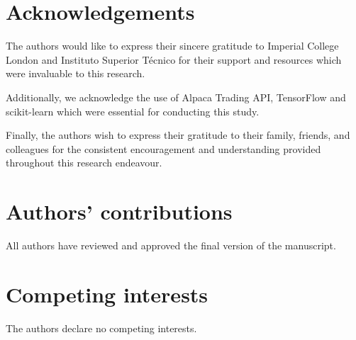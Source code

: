 \documentclass[letterpaper]{article}
\begin{document}
\section*{Acknowledgements}
The authors would like to express their sincere gratitude to Imperial College London and Instituto Superior Técnico for their support and resources which were invaluable to this research.

Additionally, we acknowledge the use of Alpaca Trading API, TensorFlow and scikit-learn which were essential for conducting this study.

Finally, the authors wish to express their gratitude to their family, friends, and colleagues for the consistent encouragement and understanding provided throughout this research endeavour.

\section*{Authors’ contributions}
All authors have reviewed and approved the final version of the manuscript.

\section*{Competing interests}
The authors declare no competing interests.
%
%



\end{document}
